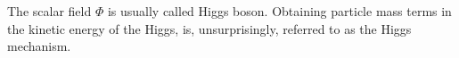 The scalar field $\Phi$ is usually called Higgs boson. Obtaining particle mass terms in the kinetic energy of the Higgs, is, unsurprisingly, referred to as the Higgs mechanism. 
%
%
